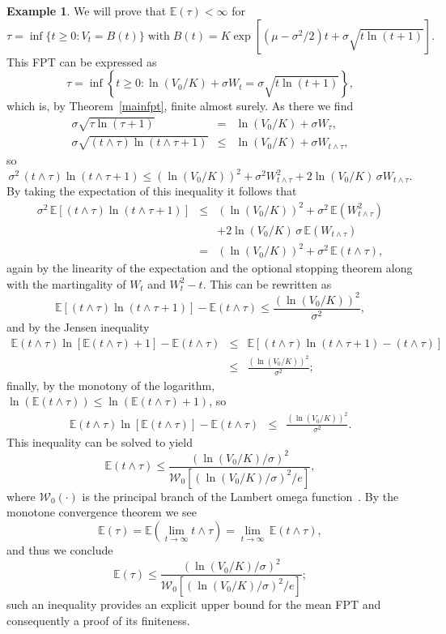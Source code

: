 \documentclass[12pt]{article}
\theoremstyle{definition}
\newtheorem{example}{Example}[theorem]
\begin{document}
\begin{example}\label{examplej}
We will prove that $\mathbb{E}(\tau)<\infty$ for
$$
\tau = \inf \{t \ge 0 : V_t = B(t)\}\;\text{with}\;
B(t) = K \exp \! \left[(\mu-\sigma^2/2)t + \sigma \sqrt{t \ln(t+1)}\right] \! .
$$
This FPT can be expressed as
$$
\tau=\inf \left\{t \ge 0 : \ln(V_0/K) + \sigma W_t = \sigma \sqrt{t \ln(t+1)} \right\},
$$
which is, by Theorem~\ref{mainfpt}, finite almost surely.
As there we find
\begin{eqnarray}\nonumber
\sigma \sqrt{\tau \ln(\tau+1)} &=& \ln(V_0/K) + \sigma W_\tau, \\ \nonumber
\sigma \sqrt{(t \wedge \tau) \ln(t \wedge \tau+1)} &\le& \ln(V_0/K) + \sigma W_{t \wedge \tau},
\end{eqnarray}
so
$$
\sigma^2 \, (t \wedge \tau) \ln(t \wedge \tau+1) \le (\ln(V_0/K))^2 + \sigma^2 W_{t \wedge \tau}^2 + 2 \ln(V_0/K) \, \sigma W_{t \wedge \tau}.
$$
By taking the expectation of this inequality it follows that
\begin{eqnarray}\nonumber
\sigma^2 \, \mathbb{E} \left[(t \wedge \tau) \ln(t \wedge \tau+1) \right] &\le& (\ln(V_0/K))^2 + \sigma^2 \, \mathbb{E}(W_{t \wedge \tau}^2) \\ \nonumber &&
+ 2 \ln(V_0/K) \, \sigma \, \mathbb{E} (W_{t \wedge \tau}) 
\\
\nonumber
&=& (\ln(V_0/K))^2 + \sigma^2 \, \mathbb{E}(t \wedge \tau),
\end{eqnarray}
again by the linearity of the expectation and the optional stopping theorem along with the martingality of $W_t$ and $W_t^2 -t$. This can be rewritten as
$$
\mathbb{E} \left[(t \wedge \tau) \ln(t \wedge \tau+1) \right]
- \mathbb{E}(t \wedge \tau) \le \frac{(\ln(V_0/K))^2}{\sigma^2},
$$
and by the Jensen inequality
\begin{eqnarray}\nonumber
\mathbb{E} (t \wedge \tau) \ln \left[ \mathbb{E}(t \wedge \tau) +1 \right]
- \mathbb{E}(t \wedge \tau) &\le&
\mathbb{E} \left[(t \wedge \tau) \ln(t \wedge \tau +1) - (t \wedge \tau) \right]
\\ \nonumber
&\le& \frac{(\ln(V_0/K))^2}{\sigma^2};
\end{eqnarray}
finally, by the monotony of the logarithm, $\ln(\mathbb{E}(t \wedge \tau))\leq \ln(\mathbb{E}(t \wedge \tau)+1)$, so
\begin{eqnarray}\nonumber
\mathbb{E} (t \wedge \tau) \ln \left[ \mathbb{E}(t \wedge \tau) \right]
- \mathbb{E}(t \wedge \tau) &\le&\frac{(\ln(V_0/K))^2}{\sigma^2}.
\end{eqnarray}
This inequality can be solved to yield
$$
\mathbb{E} (t \wedge \tau) \le \frac{(\ln(V_0/K)/\sigma)^2}{\mathcal{W}_0\left[ (\ln(V_0/K)/\sigma)^2/e \right]},
$$
where $\mathcal{W}_0(\cdot)$ is the principal branch of the Lambert omega function~\cite{Corless1996LambertW}. By the monotone convergence theorem we see
$$
\mathbb{E} (\tau) = \mathbb{E} \left( \lim_{t \to \infty} t \wedge \tau \right) = \lim_{t \to \infty} \, \mathbb{E} (t \wedge \tau),$$
and thus we conclude
$$
\mathbb{E} (\tau) \le \frac{(\ln(V_0/K)/\sigma)^2}{\mathcal{W}_0\left[ (\ln(V_0/K)/\sigma)^2/e \right]};
$$
such an inequality provides an explicit upper bound for the mean FPT and consequently a proof of its finiteness. 
\end{example}
\end{document}
